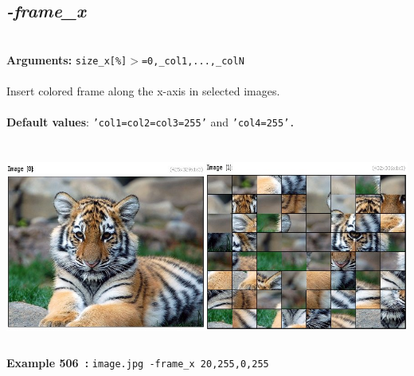 \documentclass[a4paper,11pt,twoside]{book}
\begin{document}
\subsection{\emph{-frame\_x} }\vspace*{-0.5em}
~\\\textbf{Arguments: } 
{\small \texttt{size\_x[\%]$>$=0,\_col1,...,\_colN}}\\~\\
Insert colored frame along the x-axis in selected images.
~\\~\\\textbf{Default values}: {\small \texttt{'col1=col2=col3=255'} and \texttt{'col4=255'.}}
\begin{center}\includegraphics[keepaspectratio=true,height=7cm,width=\textwidth]{img/gmic_def506.jpg}\\
{\footnotesize \textbf{Example 506~:} \texttt{image.jpg -frame\_x 20,255,0,255}}
\end{center}
\end{document}
